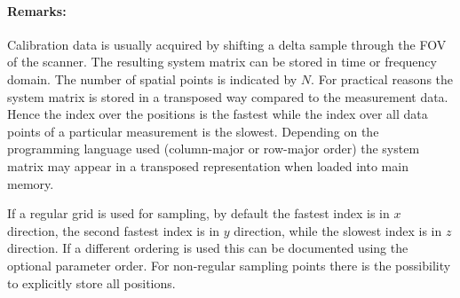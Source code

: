 \documentclass[landscape]{article} %
\newcommand{\inlvar}[1]{{\ttfamily#1}}
\begin{document}
\begin{multicols}{2}

\paragraph{Remarks:}
Calibration data is usually acquired by shifting a delta sample through the FOV of the scanner. The resulting system matrix can be stored in time or frequency domain. The number of spatial points is indicated by $N$. For practical reasons the system matrix is stored in a transposed way compared to the measurement data. Hence the index over the positions is the fastest while the index over all data points of a particular measurement is the slowest. Depending on the programming language used (column-major or row-major order) the system matrix may appear in a transposed representation when loaded into main memory.

If a regular grid is used for sampling, by default the fastest index is in $x$ direction, the second fastest index is in $y$ direction, while the slowest index is in $z$ direction. If a different ordering is used this can be documented using the optional parameter \inlvar{order}. For non-regular sampling points there is the possibility to explicitly store all positions. \newline

\end{multicols}
\end{document}
